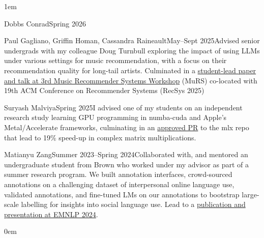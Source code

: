 \leftskip1em\relax

  {\normalsize Dobbs Conrad}{\normalsize Spring 2026}{}{}

    {\normalsize Paul Gagliano, Griffin Homan, Cassandra Raineault}{\normalsize May--Sept 2025}{}{Advised senior undergrads with my colleague Doug Turnbull exploring the impact of using LLMs under various settings for music recommendation, with a focus on their recommendation quality for long-tail artists. Culminated in a \href{https://ceur-ws.org/Vol-4045/}{student-lead paper and talk at 3rd Music Recommender Systems Workshop} (MuRS) co-located with 19th ACM
    Conference on Recommender Systems (RecSys 2025)}

  {\normalsize Suryash Malviya}{\normalsize Spring 2025}{}{I advised one of my students on an independent research study learning GPU programming in numba-cuda and Apple’s Metal/Accelerate frameworks, culminating in an \href{https://github.com/ml-explore/mlx/pull/2220}{approved PR} to the {\ttfamily mlx} repo that lead to 19\% speed-up in complex matrix multiplications. }

  {\normalsize Matianyu Zang}{\normalsize Summer 2023--Spring 2024}{}{Collaborated with, and mentored an undergraduate student from Brown who worked under my advisor as part of a summer research program. We built annotation interfaces, crowd-sourced annotations on a challenging dataset of interpersonal online language use, validated annotations, and fine-tuned LMs on our annotations to bootstrap large-scale labelling for insights into social language use. Lead to a \href{https://aclanthology.org/2024.findings-emnlp.571/}{publication and presentation at EMNLP 2024}.}

\leftskip0em\relax